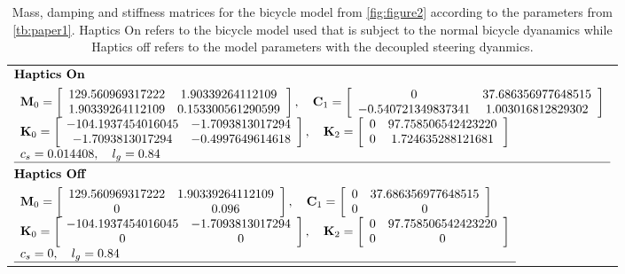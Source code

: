 \begin{table}[h]
    \caption{Mass, damping and stiffness matrices for the bicycle model from \cref{fig:figure2} according to the parameters from \cref{tb:paper1}. Haptics On refers to the bicycle model used that is subject to the normal bicycle dyanamics while Haptics off refers to  the model parameters with the decoupled steering dyanmics.}
\begin{tabular}{l}

           {$\!\begin{aligned}    &\textbf{Haptics On}\\
          &\begin{array}{l}{\mathbf{M}_{0}=\left[\begin{array}{cc}{129.560969317222} & {1.90339264112109} \\ {1.90339264112109} & {0.153300561290599}\end{array}\right], \quad \mathbf{C}_{1}=\left[\begin{array}{cc}{0} & {37.686356977648515} \\ {-0.540721349837341} & {1.003016812829302}\end{array}\right]} \\ {\mathbf{K}_{0}=\left[\begin{array}{cc}{-104.1937454016045} & {-1.7093813017294}  \\ {-1.7093813017294} & {-0.4997649614618}\end{array}\right], \quad \mathbf{K}_{2}=\left[\begin{array}{ccc}{0} & {97.758506542423220} \\  {0} & {1.724635288121681}\end{array}\right]} \\ {c_s}= {0.014408} , \quad l_g=0.84  \\ \hline\end{array}\\
              &\textbf{Haptics Off}\\
          &\begin{array}{l}{\mathbf{M}_{0}=\left[\begin{array}{cc}{129.560969317222} & {1.90339264112109} \\ {0} & {0.096}\end{array}\right], \quad \mathbf{C}_{1}=\left[\begin{array}{cc}{0} & {37.686356977648515} \\ {0} & {0}\end{array}\right]} \\ {\mathbf{K}_{0}=\left[\begin{array}{cc}{-104.1937454016045} & {-1.7093813017294}  \\ {0} & {0}\end{array}\right], \quad \mathbf{K}_{2}=\left[\begin{array}{ccc}{0} & {97.758506542423220} \\  {0} & {0}\end{array}\right]} \\ {c_s}= {0} , \quad l_g=0.84  \\ \hline\end{array}\end{aligned}$}
  \end{tabular}
\end{table}